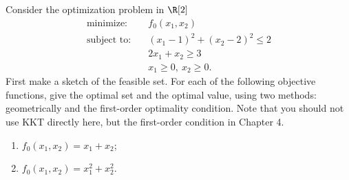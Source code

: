 \documentclass[11pt]{article}
\DeclareMathOperator{\minimize}{minimize:}
\DeclareMathOperator{\subjectto}{subject\ to:}
\begin{document}
\begin{homeworkProblem}
    Consider the optimization problem in $\R[2]$
    \begin{align*}
        \minimize  & \quad  f_0(x_1, x_2)                    \\
        \subjectto & \quad  (x_1 - 1)^2 + (x_2 - 2)^2 \leq 2 \\
                   & \quad  2x_1 + x_2 \geq 3                \\
                   & \quad  x_1 \geq 0, \ x_2 \geq 0.
    \end{align*}
    First make a sketch of the feasible set. For each of the following objective functions, give
    the optimal set and the optimal value, using two methods: geometrically and the first-order
    optimality condition. Note that you should not use KKT directly here, but the first-order
    condition in Chapter 4.
    \begin{enumerate}[label=(\alph*), topsep=5pt, itemsep=5pt]
        \item $f_0(x_1, x_2) = x_1 + x_2$;
        \item $f_0(x_1, x_2) = x_1^2 + x_2^2$. \newline
    \end{enumerate}

    \solution
    \begin{figure}[hbpt!]
        \centering

\end{figure}
\end{homeworkProblem}
\end{document}

